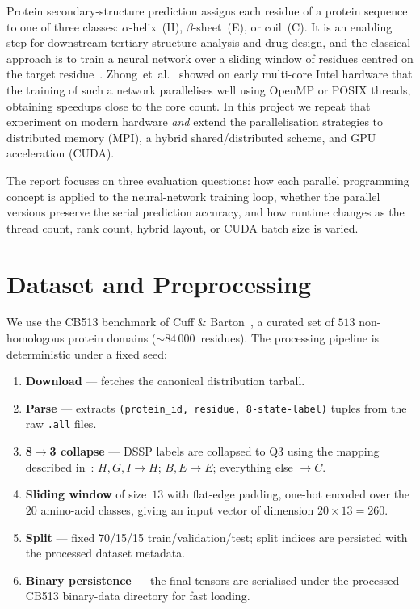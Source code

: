 \documentclass[11pt,a4paper]{article}
\begin{document}
Protein secondary-structure prediction assigns each residue of a protein
sequence to one of three classes: $\alpha$-helix~(H), $\beta$-sheet~(E), or
coil~(C). It is an enabling step for downstream tertiary-structure analysis
and drug design, and the classical approach is to train a neural network
over a sliding window of residues centred on the target
residue~\cite{rost1993,zhong2007}. Zhong~et~al.~\cite{zhong2007} showed on
early multi-core Intel hardware that the training of such a network
parallelises well using OpenMP or POSIX threads, obtaining speedups close
to the core count. In this project we repeat that experiment on modern
hardware \emph{and} extend the parallelisation strategies to distributed
memory (MPI), a hybrid shared/distributed scheme, and GPU acceleration
(CUDA).

The report focuses on three evaluation questions: how each parallel
programming concept is applied to the neural-network training loop, whether
the parallel versions preserve the serial prediction accuracy, and how
runtime changes as the thread count, rank count, hybrid layout, or CUDA
batch size is varied.

\section{Dataset and Preprocessing}\label{sec:data}

We use the CB513 benchmark of Cuff \& Barton~\cite{cuff1999}, a curated
set of $513$ non-homologous protein domains (${\sim}84\,000$~residues). The
processing pipeline is deterministic under a fixed seed:

\begin{enumerate}[noitemsep,topsep=2pt]
  \item \textbf{Download} --- fetches the canonical distribution tarball.
  \item \textbf{Parse} --- extracts \texttt{(protein\_id, residue,
        8-state-label)} tuples from the raw \texttt{.all} files.
  \item \textbf{8$\to$3 collapse} --- DSSP labels are collapsed to Q3
        using the mapping described in~\cite{zhong2007}:
        \(H,G,I \to H\); \(B,E \to E\); everything else $\to C$.
  \item \textbf{Sliding window} of size~$13$ with flat-edge padding,
        one-hot encoded over the $20$ amino-acid classes, giving an
        input vector of dimension \(20 \times 13 = 260\).
  \item \textbf{Split} --- fixed 70/15/15 train/validation/test; split indices
        are persisted with the processed dataset metadata.
  \item \textbf{Binary persistence} --- the final tensors are serialised
        under the processed CB513 binary-data directory for fast loading.
\end{enumerate}
\end{document}
